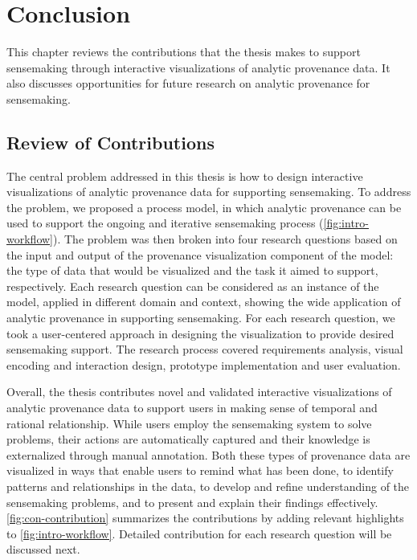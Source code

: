 \chapter{Conclusion}
\label{chap:conclusion}

\graphicspath{{Chapter7/figures/}}

This chapter reviews the contributions that the thesis makes to support sensemaking through interactive visualizations of analytic provenance data. It also discusses opportunities for future research on analytic provenance for sensemaking.

\section{Review of Contributions}
The central problem addressed in this thesis is how to design interactive visualizations of analytic provenance data for supporting sensemaking. To address the problem, we proposed a process model, in which analytic provenance can be used to support the ongoing and iterative sensemaking process (\autoref{fig:intro-workflow}). The problem was then broken into four research questions based on the input and output of the provenance visualization component of the model: the type of data that would be visualized and the task it aimed to support, respectively. Each research question can be considered as an instance of the model, applied in different domain and context, showing the wide application of analytic provenance in supporting sensemaking. For each research question, we took a user-centered approach in designing the visualization to provide desired sensemaking support. The research process covered requirements analysis, visual encoding and interaction design, prototype implementation and user evaluation. 

Overall, the thesis contributes novel and validated interactive visualizations of analytic provenance data to support users in making sense of temporal and rational relationship. While users employ the sensemaking system to solve problems, their actions are automatically captured and their knowledge is externalized through manual annotation. Both these types of provenance data are visualized in ways that enable users to remind what has been done, to identify patterns and relationships in the data, to develop and refine understanding of the sensemaking problems, and to present and explain their findings effectively. \autoref{fig:con-contribution} summarizes the contributions by adding relevant highlights to \autoref{fig:intro-workflow}. Detailed contribution for each research question will be discussed next.

